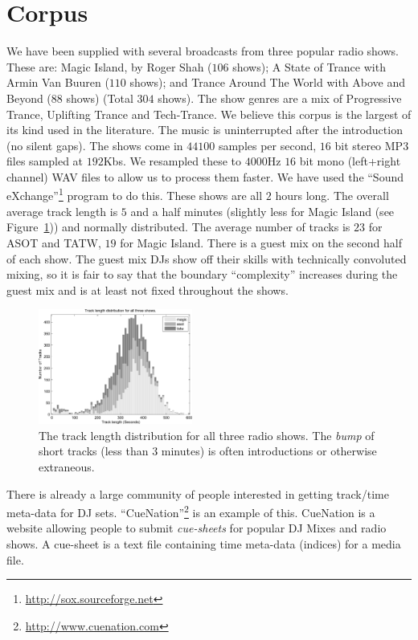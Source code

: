 \documentclass[twocolumn]{article}
\begin{document}
	\section{Corpus}\label{dataset}
	
	We have been supplied with several broadcasts from three popular radio shows. These are: Magic Island, by Roger Shah ($106$ shows); A State of Trance with Armin Van Buuren ($110$ shows); and Trance Around The World with Above and Beyond ($88$ shows) (Total $304$ shows). The show genres are a mix of Progressive Trance, Uplifting Trance and Tech-Trance. We believe this corpus is the largest of its kind used \cite{peiszer2008automatic} in the literature.  
	The music is uninterrupted after the introduction (no silent gaps). 
	The shows come in $44100$ samples per second, $16$ bit stereo MP3 files sampled at $192$Kbs. We resampled these to $4000$Hz $16$ bit mono (left+right channel) WAV files to allow us to process them faster. We have used the ``Sound eXchange''\footnote{\url{http://sox.sourceforge.net}}  program to do this. These shows are all $2$ hours long. The overall average track length is $5$ and a half minutes (slightly less for Magic Island (see Figure~\ref{fig:tracklengths})) and normally distributed. The average number of tracks is $23$ for ASOT and TATW, $19$ for Magic Island. There is a guest mix on the second half of each show. The guest mix DJs show off their skills with technically convoluted mixing, so it is fair to say that the boundary ``complexity'' increases during the guest mix and is at least not fixed throughout the shows.
	
	\begin{figure}
		\centering
		\includegraphics[width=0.45\textwidth]{images/tracklength.pdf}
		
		\caption{The track length distribution for all three radio shows. The \textit{bump} of short tracks (less than $3$ minutes) is often introductions or otherwise extraneous.}
		\label{fig:tracklengths}
	\end{figure} 
	
	There is already a large community of people interested in getting track/time meta-data for DJ sets. ``CueNation''\footnote{\url{http://www.cuenation.com}} is an example of this. CueNation is a website allowing people to submit \textit{cue-sheets} for popular DJ Mixes and radio shows. A cue-sheet is a text file containing time meta-data (indices) for a media file.
	
\end{document}
